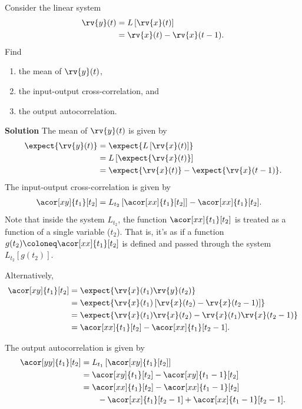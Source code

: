 \begin{example}
    Consider the linear system 
    \begin{align}
        \rv{y}(t) &= L\left[ \rv{x}(t) \right]\\
        &= \rv{x}(t) - \rv{x}(t-1).
    \end{align}
    Find
    \begin{enumerate}
        \item the mean of $\rv{y}(t)$, 
        \item the input-output cross-correlation, and
        \item the output autocorrelation.
    \end{enumerate}

    \textbf{Solution}
    The mean of $\rv{y}(t)$ is given by
    \begin{align}
        \expect{\rv{y}(t)} &= \expect{L\left[ \rv{x}(t) \right]}\\
        &= L\left[ \expect{ \rv{x}(t)} \right]\\
        &= \expect{\rv{x}(t)} - \expect{\rv{x}(t-1)}.
    \end{align}
    The input-output cross-correlation is given by
    \begin{align}
        \acor[xy]{t_{1}}[t_{2}] &= L_{t_{2}}\left[ \acor[xx]{t_{1}}[t_{2}] \right] - \acor[xx]{t_{1}}[t_{2}].
    \end{align}
    Note that inside the system $L_{t_{2}}$, the function $\acor[xx]{t_{1}}[t_{2}]$ is treated as a function of a single variable ($t_{2}$). That is, it's as if a function $g(t_{2}) \coloneq \acor[xx]{t_{1}}[t_{2}]$ is defined and passed through the system $L_{t_{2}}\left[ g(t_{2}) \right]$.

    Alternatively,
    \begin{align}
        \acor[xy]{t_{1}}[t_{2}] &= \expect{\rv{x}(t_{1})\rv{y}(t_{2})}\\
        &= \expect{\rv{x}(t_{1})\left[ \rv{x}(t_{2}) - \rv{x}(t_{2}-1) \right]}\\
        &= \expect{ \rv{x}(t_{1})\rv{x}(t_{2}) - \rv{x}(t_{1})\rv{x}(t_{2}-1)}\\
        &= \acor[xx]{t_{1}}[t_{2}] - \acor[xx]{t_{1}}[t_{2}-1].
    \end{align}

    The output autocorrelation is given by
    \begin{align}
        \acor[yy]{t_{1}}[t_{2}] &= L_{t_{1}}\left[ \acor[xy]{t_{1}}[t_{2}] \right]\\
        &= \acor[xy]{t_{1}}[t_{2}] - \acor[xy]{t_{1}-1}[t_{2}]\\
        &= \acor[xx]{t_{1}}[t_{2}] - \acor[xx]{t_{1}-1}[t_{2}]  \nonumber\\&\qquad
        - \acor[xx]{t_{1}}[t_{2}-1] + \acor[xx]{t_{1} - 1}[t_{2} - 1].
    \end{align}
\end{example}

